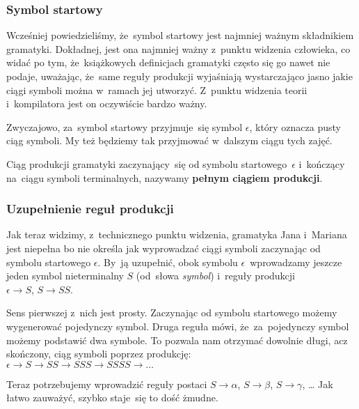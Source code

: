 \documentclass[10pt,t]{beamer}
\begin{document}
\begin{frame}
  \frametitle{Symbol startowy}


  Wcześniej powiedzieliśmy, że~symbol startowy jest najmniej ważnym
  składnikiem gramatyki. Dokładnej, jest ona najmniej ważny z~punktu
  widzenia człowieka, co widać po tym, że~książkowych definicjach gramatyki
  często się go nawet nie podaje, uważając, że~same reguły produkcji
  wyjaśniają wystarczająco jasno jakie ciągi symboli można w~ramach jej
  utworzyć. Z~punktu widzenia teorii i~kompilatora jest on oczywiście
  bardzo ważny.

  Zwyczajowo, za~symbol startowy przyjmuje~się symbol $\epsilon$, który oznacza
  pusty ciąg symboli. My też będziemy tak przyjmować w~dalszym ciągu tych
  zajęć.

  Ciąg produkcji gramatyki zaczynający~się od symbolu startowego~$\epsilon$
  i~kończący na~ciągu symboli terminalnych, nazywamy \textbf{pełnym ciągiem
    produkcji}.

\end{frame}





\begin{frame}
  \frametitle{Uzupełnienie reguł produkcji}


  Jak teraz widzimy, z~technicznego punktu widzenia, gramatyka Jana
  i~Mariana jest niepełna bo nie określa jak wyprowadzać ciągi symboli
  zaczynając od symbolu startowego $\epsilon$. By~ją uzupełnić, obok symbolu
  $\epsilon$~wprowadzamy jeszcze jeden symbol nieterminalny $S$
  (od~słowa \textit{symbol}) i~reguły produkcji \\
  $\epsilon \to S$, $S \to SS$.

  Sens pierwszej z~nich jest prosty. Zaczynając od symbolu startowego
  możemy wygenerować pojedynczy symbol. Druga reguła mówi, że~za~pojedynczy
  symbol możemy podstawić dwa symbole. To pozwala nam otrzymać dowolnie
  długi, acz skończony, ciąg symboli poprzez produkcję: \\
  $\epsilon \to S \to SS \to SSS \to SSSS \to \ldots$

  Teraz potrzebujemy wprowadzić reguły postaci $S \to \alpha$, $S \to \beta$,
  $S \to \gamma$, \ldots{ } Jak łatwo zauważyć, szybko staje~się to dość żmudne.

\end{frame}
\end{document}
